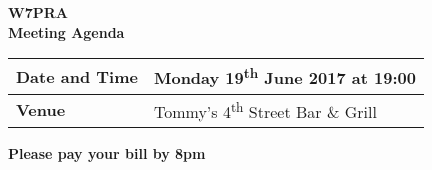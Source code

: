 \documentclass[letter,11pt]{extarticle}
\begin{document}
	\thispagestyle{empty}
	
	\begin{center}
		\textbf{W7PRA\\Meeting Agenda}
		\vspace{0.33cm}
	\end{center}
	
	\begin{center}
		\begin{tabular}{| m{3.0cm} | m{7.5cm} |} \hline
			\textbf{Date and Time} & Monday 19\textsuperscript{th} June 2017 at 19:00 \\ \hline
			\textbf{Venue} & Tommy's 4\textsuperscript{th} Street Bar \& Grill \\ \hline
				\end{tabular}
	\end{center}
	
	\begin{center}
		\textbf{Please pay your bill by 8pm}
	\end{center}
	
\end{document}
